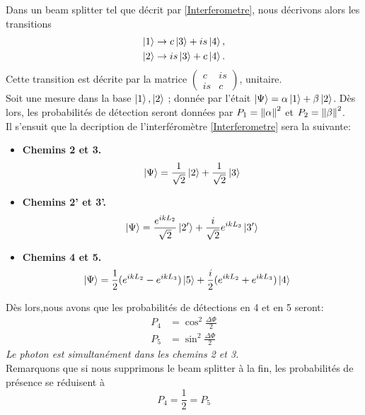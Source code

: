 \documentclass[../notesdecours.tex]{subfiles}
\begin{document}
Dans un beam splitter tel que décrit par \eqref{Interferometre}, nous décrivons alors les transitions
\begin{align}
\ket{1} &\rightarrow c\ket{3} + is\ket{4},\\
\ket{2} &\rightarrow is\ket{3} + c\ket{4}.
\end{align}
Cette transition est décrite par la matrice  $\begin{pmatrix}
c & is\\
is & c
\end{pmatrix}$, unitaire.\\

Soit une mesure dans la base $\ket{1},\ket{2}$ ; donnée par l'était $\ket{\Psi} = \alpha\ket{1}+\beta\ket{2}$. Dès lors, les probabilités de détection seront données par $P_1 = \norm{\alpha}^2$ et $P_2 = \norm{\beta}^2$.\\

Il s'ensuit que la decription de l'interféromètre \ref{Interferometre} sera la suivante:
\begin{itemize}
\item \textbf{Chemins 2 et 3.}
\begin{equation}
\ket{\Psi} = \frac{1}{\sqrt{2}}\ket{2} + \frac{1}{\sqrt{2}}\ket{3}
\end{equation}
\item \textbf{Chemins 2' et 3'.}
\begin{align}
\ket{\Psi} &= \frac{e^{ikL_2}}{\sqrt{2}}\ket{2'} + \frac{i}{\sqrt{2}}e^{ikL_3}\ket{3'}\\
\end{align}
\item \textbf{Chemins 4 et 5.}
\begin{align}
\ket{\Psi} &= \frac{1}{2} (e^{ikL_2} - e^{ikL_3})\ket{5} + \frac{i}{2}(e^{ikL_2} + e^{ikL_3})\ket{4}
\end{align}
\end{itemize}
Dès lors,nous avons que les probabilités de détections en 4 et en 5 seront:
\begin{align}
P_4 &= \cos^2 \frac{\Delta \Phi}{2}\\
P_5 &= \sin^2 \frac{\Delta \Phi}{2}
\end{align}
\emph{Le photon est simultanément dans les chemins 2 et 3.}\\

Remarquons que si nous supprimons le beam splitter à la fin, les probabilités de présence se réduisent à
\begin{equation}
P_4 = \frac{1}{2} = P_5
\end{equation}
\end{document}
